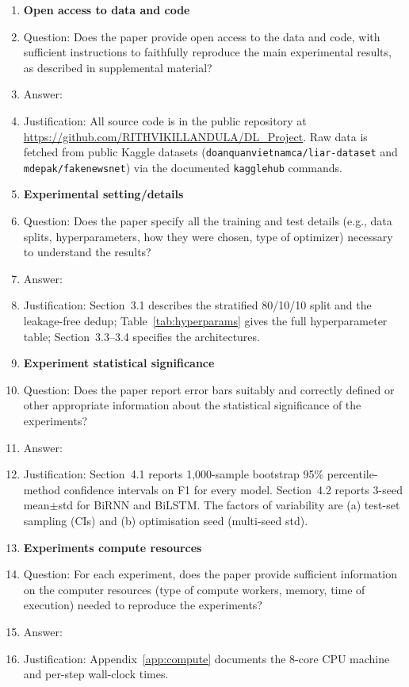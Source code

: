 \documentclass{article}
\begin{document}
\begin{enumerate}
\item {\bf Open access to data and code}
    \item[] Question: Does the paper provide open access to the data and code, with sufficient instructions to faithfully reproduce the main experimental results, as described in supplemental material?
    \item[] Answer: \answerYes{}
    \item[] Justification: All source code is in the public repository at \url{https://github.com/RITHVIKILLANDULA/DL_Project}. Raw data is fetched from public Kaggle datasets (\texttt{doanquanvietnamca/liar-dataset} and \texttt{mdepak/fakenewsnet}) via the documented \texttt{kagglehub} commands.

\item {\bf Experimental setting/details}
    \item[] Question: Does the paper specify all the training and test details (e.g., data splits, hyperparameters, how they were chosen, type of optimizer) necessary to understand the results?
    \item[] Answer: \answerYes{}
    \item[] Justification: Section~3.1 describes the stratified 80/10/10 split and the leakage-free dedup; Table~\ref{tab:hyperparams} gives the full hyperparameter table; Section~3.3--3.4 specifies the architectures.

\item {\bf Experiment statistical significance}
    \item[] Question: Does the paper report error bars suitably and correctly defined or other appropriate information about the statistical significance of the experiments?
    \item[] Answer: \answerYes{}
    \item[] Justification: Section~4.1 reports 1{,}000-sample bootstrap 95\% percentile-method confidence intervals on F1 for every model. Section~4.2 reports 3-seed mean$\pm$std for BiRNN and BiLSTM. The factors of variability are (a) test-set sampling (CIs) and (b) optimisation seed (multi-seed std).

\item {\bf Experiments compute resources}
    \item[] Question: For each experiment, does the paper provide sufficient information on the computer resources (type of compute workers, memory, time of execution) needed to reproduce the experiments?
    \item[] Answer: \answerYes{}
    \item[] Justification: Appendix~\ref{app:compute} documents the 8-core CPU machine and per-step wall-clock times.


\end{enumerate}
\end{document}

